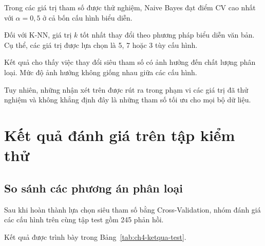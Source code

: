 Trong các giá trị tham số được thử nghiệm,
Naive Bayes đạt điểm CV cao nhất với
$\alpha=0,5$ ở cả bốn cấu hình biểu diễn.

Đối với K-NN, giá trị $k$ tốt nhất thay đổi theo
phương pháp biểu diễn văn bản. Cụ thể, các giá trị
được lựa chọn là 5, 7 hoặc 3 tùy cấu hình.

Kết quả cho thấy việc thay đổi siêu tham số có
ảnh hưởng đến chất lượng phân loại. Mức độ ảnh
hưởng không giống nhau giữa các cấu hình.

Tuy nhiên, những nhận xét trên được rút ra trong
phạm vi các giá trị đã thử nghiệm và không khẳng
định đây là những tham số tối ưu cho mọi bộ dữ liệu.


\section{Kết quả đánh giá trên tập kiểm thử}

\subsection{So sánh các phương án phân loại}

Sau khi hoàn thành lựa chọn siêu tham số bằng
Cross-Validation, nhóm đánh giá các cấu hình
trên cùng tập test gồm 245 phản hồi.

Kết quả được trình bày trong
Bảng~\ref{tab:ch4-ketqua-test}.


